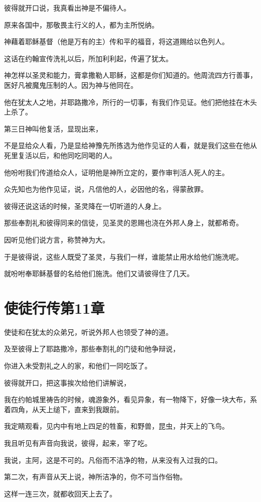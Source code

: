 \documentclass[12pt,oneside]{book}
\begin{document}
彼得就开口说，我真看出神是不偏待人。

原来各国中，那敬畏主行义的人，都为主所悦纳。

神藉着耶稣基督（他是万有的主）传和平的福音，将这道赐给以色列人。

这话在约翰宣传洗礼以后，所加利利起，传遍了犹太。

神怎样以圣灵和能力，膏拿撒勒人耶稣，这都是你们知道的。他周流四方行善事，医好凡被魔鬼压制的人。因为神与他同在。

他在犹太人之地，并耶路撒冷，所行的一切事，有我们作见证。他们把他挂在木头上杀了。

第三日神叫他复活，显现出来，

不是显给众人看，乃是显给神豫先所拣选为他作见证的人看，就是我们这些在他从死里复活以后，和他同吃同喝的人。

他吩咐我们传道给众人，证明他是神所立定的，要作审判活人死人的主。

众先知也为他作见证，说，凡信他的人，必因他的名，得蒙赦罪。

彼得还说这话的时候，圣灵降在一切听道的人身上。

那些奉割礼和彼得同来的信徒，见圣灵的恩赐也浇在外邦人身上，就都希奇。

因听见他们说方言，称赞神为大。

于是彼得说，这些人既受了圣灵，与我们一样，谁能禁止用水给他们施洗呢。

就吩咐奉耶稣基督的名给他们施洗。他们又请彼得住了几天。

\chapter{使徒行传第11章}
使徒和在犹太的众弟兄，听说外邦人也领受了神的道。

及至彼得上了耶路撒冷，那些奉割礼的门徒和他争辩说，

你进入未受割礼之人的家，和他们一同吃饭了。

彼得就开口，把这事挨次给他们讲解说，

我在约帕城里祷告的时候，魂游象外，看见异象，有一物降下，好像一块大布，系着四角，从天上缒下，直来到我跟前。

我定睛观看，见内中有地上四足的牲畜，和野兽，昆虫，并天上的飞鸟。

我且听见有声音向我说，彼得，起来，宰了吃。

我说，主阿，这是不可的。凡俗而不洁净的物，从来没有入过我的口。

第二次，有声音从天上说，神所洁净的，你不可当作俗物。

这样一连三次，就都收回天上去了。
\end{document}
